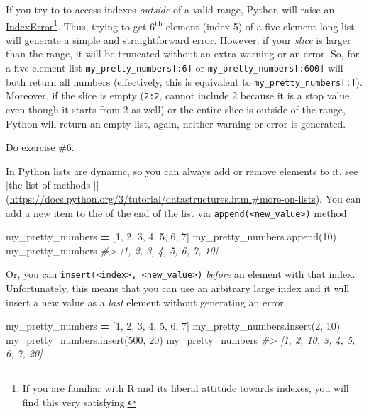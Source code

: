 \documentclass[
]{book}
\newenvironment{Shaded}{\begin{snugshade}}{\end{snugshade}}
\newcommand{\CommentTok}[1]{\textcolor[rgb]{0.56,0.35,0.01}{\textit{#1}}}
\newcommand{\DecValTok}[1]{\textcolor[rgb]{0.00,0.00,0.81}{#1}}
\newcommand{\NormalTok}[1]{#1}
\newcommand{\OperatorTok}[1]{\textcolor[rgb]{0.81,0.36,0.00}{\textbf{#1}}}
\begin{document}
If you try to to access indexes \emph{outside} of a valid range, Python will raise an \href{https://docs.python.org/3/library/exceptions.html\#IndexError}{IndexError}\footnote{If you are familiar with R and its liberal attitude towards indexes, you will find this very satisfying.}. Thus, trying to get 6\textsuperscript{th} element (index 5) of a five-element-long list will generate a simple and straightforward error. However, if your \emph{slice} is larger than the range, it will be truncated without an extra warning or an error. So, for a five-element list \texttt{my\_pretty\_numbers{[}:6{]}} or \texttt{my\_pretty\_numbers{[}:600{]}} will both return all numbers (effectively, this is equivalent to \texttt{my\_pretty\_numbers{[}:{]}}). Moreover, if the slice is empty (\texttt{2:2}, cannot include 2 because it is a stop value, even though it starts from 2 as well) or the entire slice is outside of the range, Python will return an empty list, again, neither warning or error is generated.

Do exercise \#6.

In Python lists are dynamic, so you can always add or remove elements to it, see {[}the list of methods {]}{]}(\url{https://docs.python.org/3/tutorial/datastructures.html\#more-on-lists}). You can add a new item to the of the end of the list via \texttt{append(\textless{}new\_value\textgreater{})} method

\begin{Shaded}
\begin{Highlighting}[]
\NormalTok{my\_pretty\_numbers }\OperatorTok{=}\NormalTok{ [}\DecValTok{1}\NormalTok{, }\DecValTok{2}\NormalTok{, }\DecValTok{3}\NormalTok{, }\DecValTok{4}\NormalTok{, }\DecValTok{5}\NormalTok{, }\DecValTok{6}\NormalTok{, }\DecValTok{7}\NormalTok{]}
\NormalTok{my\_pretty\_numbers.append(}\DecValTok{10}\NormalTok{)}
\NormalTok{my\_pretty\_numbers}
\CommentTok{\#\textgreater{} [1, 2, 3, 4, 5, 6, 7, 10]}
\end{Highlighting}
\end{Shaded}

Or, you can \texttt{insert(\textless{}index\textgreater{},\ \textless{}new\_value\textgreater{})} \emph{before} an element with that index. Unfortunately, this means that you can use an arbitrary large index and it will insert a new value as a \emph{last} element without generating an error.

\begin{Shaded}
\begin{Highlighting}[]
\NormalTok{my\_pretty\_numbers }\OperatorTok{=}\NormalTok{ [}\DecValTok{1}\NormalTok{, }\DecValTok{2}\NormalTok{, }\DecValTok{3}\NormalTok{, }\DecValTok{4}\NormalTok{, }\DecValTok{5}\NormalTok{, }\DecValTok{6}\NormalTok{, }\DecValTok{7}\NormalTok{]}
\NormalTok{my\_pretty\_numbers.insert(}\DecValTok{2}\NormalTok{, }\DecValTok{10}\NormalTok{)}
\NormalTok{my\_pretty\_numbers.insert(}\DecValTok{500}\NormalTok{, }\DecValTok{20}\NormalTok{)}
\NormalTok{my\_pretty\_numbers}
\CommentTok{\#\textgreater{} [1, 2, 10, 3, 4, 5, 6, 7, 20]}
\end{Highlighting}
\end{Shaded}
\end{document}
